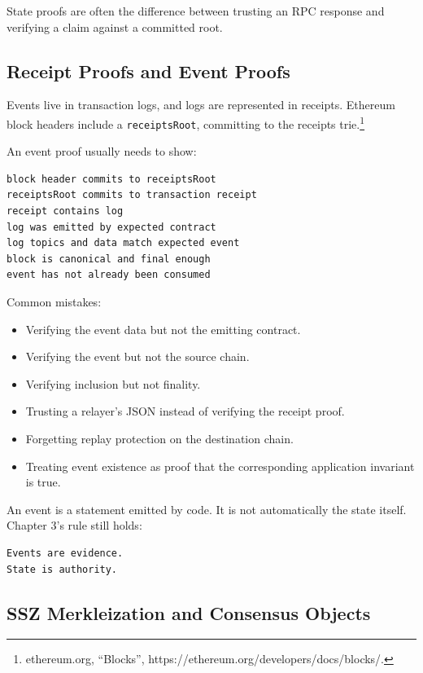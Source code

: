 State proofs are often the difference between trusting an RPC response
and verifying a claim against a committed root.

\subsection{Receipt Proofs and Event Proofs}

Events live in transaction logs, and logs are represented in receipts.
Ethereum block headers include a \passthrough{\lstinline!receiptsRoot!},
committing to the receipts trie.\footnote{ethereum.org, ``Blocks'',
  https://ethereum.org/developers/docs/blocks/.}

An event proof usually needs to show:

\begin{lstlisting}
block header commits to receiptsRoot
receiptsRoot commits to transaction receipt
receipt contains log
log was emitted by expected contract
log topics and data match expected event
block is canonical and final enough
event has not already been consumed
\end{lstlisting}

Common mistakes:

\begin{itemize}
\tightlist
\item
  Verifying the event data but not the emitting contract.
\item
  Verifying the event but not the source chain.
\item
  Verifying inclusion but not finality.
\item
  Trusting a relayer's JSON instead of verifying the receipt proof.
\item
  Forgetting replay protection on the destination chain.
\item
  Treating event existence as proof that the corresponding application
  invariant is true.
\end{itemize}

An event is a statement emitted by code. It is not automatically the
state itself. Chapter 3's rule still holds:

\begin{lstlisting}
Events are evidence.
State is authority.
\end{lstlisting}

\subsection{SSZ Merkleization and Consensus Objects}

